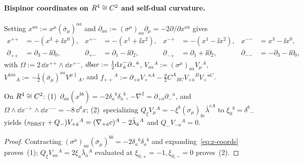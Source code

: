 \paragraph{Bispinor coordinates on $R^4\cong C^2$ and self-dual curvature.}
Setting $x^{a\dot{a}} := x^\mu(\bar{\sigma}_\mu)^{\dot{a}a}$ and $\partial_{a\dot{a}} := (\sigma^\mu)_{a\dot{a}}\partial_\mu = -2\partial/\partial x^{a\dot{a}}$ gives
\begin{equation}
\label{eq:z-coords}
\begin{aligned}
x^{+\dot{+}} &= -(x^3 + \ii x^0), & x^{+\dot{-}} &= -(x^1 + \ii x^2), &
x^{-\dot{+}} &= -(x^1 - \ii x^2), & x^{-\dot{-}} &= x^3 - \ii x^0,\\
\partial_{+\dot{+}} &= \partial_3 - \ii\partial_0, & \partial_{+\dot{-}} &= \partial_1 - \ii\partial_2, &
\partial_{-\dot{+}} &= \partial_1 + \ii\partial_2, & \partial_{-\dot{-}} &= -\partial_3 - \ii\partial_0,
\end{aligned}
\end{equation}
with $\Omega := 2\,\dd x^{+\dot{+}}\wedge\dd x^{+\dot{-}}$, $dbar := \frac{1}{2}\mathrm{d} x^-_{\dot{a}}\partial_-{}^{\dot{a}}$, $V_{a\dot{a}}{}^A := (\sigma^\mu)_{a\dot{a}}V_\mu{}^A$, $V^{\ddagger a\dot{a}}{}_A := -\frac{1}{2}(\bar{\sigma}_\mu)^{\dot{a}a}V^{\mu\ddagger}{}_A$, and $f_{++}{}^A := \partial_{+\dot{a}}V_+{}^{\dot{a}A} - \frac{g}{2}C^A{}_{BC}V_{+\dot{a}}{}^B V_+{}^{\dot{a}C}$.

\begin{proposition}
\label{prop:spinor-soldering}
On $R^4 \cong C^2$: (1)~$\partial_{a\dot{a}}(x^{b\dot{b}}) = -2\delta_a{}^b\delta_{\dot{a}}{}^{\dot{b}}$, $-\nabla^2 = \partial_{+\dot{a}}\partial_-{}^{\dot{a}}$, and $\Omega\wedge\dd x^{-\dot{+}}\wedge\dd x^{-\dot{-}} = -8\,\dd^4x$; (2)~specializing $Q_\xi V_\mu{}^A = -\xi^b(\sigma_\mu)_{b\dot{c}}\bar{\lambda}^{\dot{c}A}$ to $\xi_0{}^b = \delta^b{}_-$ yields $(s_{\mathrm{BRST}}+Q_-)V_{+\dot{a}}{}^A = (\nabla_{+\dot{a}}c)^A - 2\bar{\lambda}_{\dot{a}}{}^A$ and $Q_- V_{-\dot{a}}{}^A = 0$.
\end{proposition}

\begin{proof}
Contracting $(\sigma^\mu)_{a\dot{a}}(\bar{\sigma}_\mu)^{\dot{b}b} = -2\delta_a{}^b\delta_{\dot{a}}{}^{\dot{b}}$ and expanding~\eqref{eq:z-coords} proves~(1); $Q_\xi V_{a\dot{a}}{}^A = 2\xi_a\bar{\lambda}_{\dot{a}}{}^A$ evaluated at $\xi_{0,+}=-1, \xi_{0,-}=0$ proves~(2).
\end{proof}

